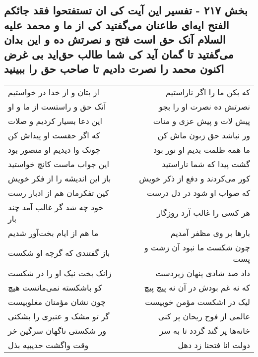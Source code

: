 \begin{center}
\section*{بخش ۲۱۷ - تفسیر این آیت کی ان تستفتحوا فقد جائکم الفتح ایه‌ای طاعنان می‌گفتید کی از ما و محمد علیه السلام آنک حق است فتح و نصرتش ده و این بدان می‌گفتید تا گمان آید کی شما طالب حق‌اید بی غرض اکنون محمد را نصرت دادیم تا صاحب حق را ببینید}
\label{sec:sh217}
\begin{longtable}{l p{0.5cm} r}
از بتان و از خدا در خواستیم
&&
که بکن ما را اگر ناراستیم
\\
آنک حق و راستست از ما و او
&&
نصرتش ده نصرت او را بجو
\\
این دعا بسیار کردیم و صلات
&&
پیش لات و پیش عزی و منات
\\
که اگر حقست او پیداش کن
&&
ور نباشد حق زبون ماش کن
\\
چونک وا دیدیم او منصور بود
&&
ما همه ظلمت بدیم او نور بود
\\
این جواب ماست کانچ خواستید
&&
گشت پیدا که شما ناراستید
\\
باز این اندیشه را از فکر خویش
&&
کور می‌کردند و دفع از ذکر خویش
\\
کین تفکرمان هم از ادبار رست
&&
که صواب او شود در دل درست
\\
خود چه شد گر غالب آمد چند بار
&&
هر کسی را غالب آرد روزگار
\\
ما هم از ایام بخت‌آور شدیم
&&
بارها بر وی مظفر آمدیم
\\
باز گفتندی که گرچه او شکست
&&
چون شکست ما نبود آن زشت و پست
\\
زانک بخت نیک او را در شکست
&&
داد صد شادی پنهان زیردست
\\
کو باشکسته نمی‌مانست هیچ
&&
که نه غم بودش در آن نه پیچ پیچ
\\
چون نشان مؤمنان مغلوبیست
&&
لیک در اشکست مؤمن خوبیست
\\
گر تو مشک و عنبری را بشکنی
&&
عالمی از فوح ریحان پر کنی
\\
ور شکستی ناگهان سرگین خر
&&
خانه‌ها پر گند گردد تا به سر
\\
وقت واگشت حدیبیه بذل
&&
دولت انا فتحنا زد دهل
\\
\end{longtable}
\end{center}
